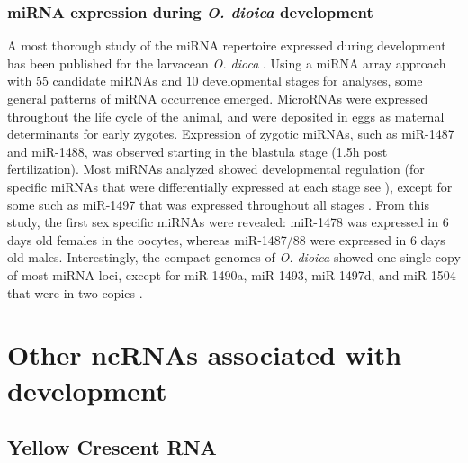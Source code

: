 \documentclass[graybox]{svmult}
\begin{document}
\subsubsection{miRNA expression during \textit{O. dioica} development}
A most thorough study of the miRNA repertoire expressed during development has 
been published for the larvacean \textit{O. dioca} \cite{Fu:08}. Using a 
miRNA array approach with $55$ candidate miRNAs and $10$ developmental stages 
for analyses, some general patterns of miRNA occurrence emerged. MicroRNAs were 
expressed throughout the life cycle of the animal, and were deposited in eggs 
as maternal determinants for early zygotes. Expression of zygotic miRNAs, such 
as miR-1487 and miR-1488, was observed starting in the blastula stage (1.5h 
post fertilization). Most miRNAs analyzed showed developmental regulation (for 
specific miRNAs that were differentially expressed at each stage see 
\cite{Fu:08}), except for some such as miR-1497 that was expressed throughout 
all stages \cite{Fu:08}. From this study, the first sex specific miRNAs were 
revealed: miR-1478 was expressed in $6$ days old females in the 
oocytes, whereas miR-1487/88 were expressed in $6$ days old males. 
Interestingly, the compact genomes of \textit{O. dioica} showed one single copy 
of most miRNA loci, except for miR-1490a, miR-1493, miR-1497d, and miR-1504 
that were in two copies \cite{Fu:08}.


\section{Other ncRNAs associated with development}
\label{sec:4}

\subsection{Yellow Crescent RNA}
\end{document}
